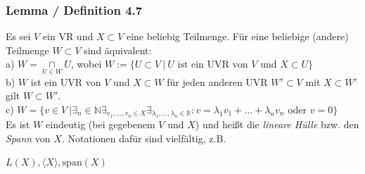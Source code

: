 \documentclass{article}
\begin{document}
\subsubsection*{Lemma / Definition 4.7}
Es sei $V$ ein VR und $X \subset V$ eine beliebig Teilmenge. Für eine beliebige (andere) Teilmenge $W \subset V$ sind äquivalent: \\
a) $W = \underset{U \in W}{\cap} U$, wobei $W := \{U \subset V \ | \ U \text{ ist ein UVR von } V \text{ und } X \subset U\}$ \\
b) $W$ ist ein UVR von $V$ und $X \subset W$ für jeden anderen UVR $W' \subset V$ mit $X \subset W'$ gilt $W \subset W'$. \\
c) $W = \{v \in V \ | \exists_n \in \mathbb{N} \exists_{v_1,...,v_n \in X} \exists_{\lambda_1,...,\lambda_n \in \mathbb{R}}: v = \lambda_1 v_1 + ... + \lambda_n v_n $ oder $ v=0\}$ \\
Es ist $W$ eindeutig (bei gegebenem $V$ und $X$) und heißt die \textit{lineare Hülle} bzw. den \textit{Spann} von $X$. Notationen dafür sind vielfältig, z.B. \\
\begin{center}
    $L(X), \langle X \rangle, \text{span}(X)$
\end{center}
\end{document}
